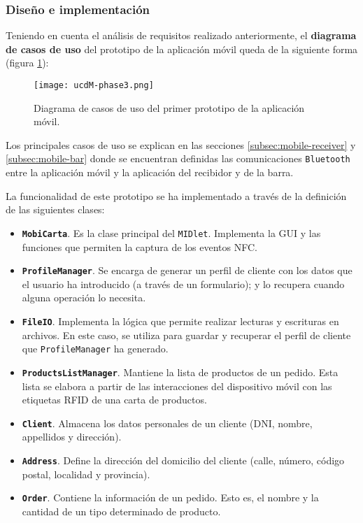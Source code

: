 \subsubsection{Diseño e implementación}
Teniendo en cuenta el análisis de requisitos realizado anteriormente, el
\textbf{diagrama de casos de uso} del prototipo de la aplicación móvil queda
de la siguiente forma (figura \ref{fig:ucdM-phase3}):

  \begin{figure}[H]
    \begin{center}
      \texttt{[image: ucdM-phase3.png]}
      \caption{Diagrama de casos de uso del primer prototipo de la aplicación
      móvil.}
      \label{fig:ucdM-phase3}
    \end{center}
  \end{figure}

Los principales casos de uso se explican en las secciones
\ref{subsec:mobile-receiver} y \ref{subsec:mobile-bar} donde se encuentran
definidas las comunicaciones \texttt{Bluetooth} entre la aplicación móvil y
la aplicación del recibidor y de la barra.

La funcionalidad de este prototipo se ha implementado a través de la
definición de las siguientes clases:
\begin{itemize}
\item \textbf{\texttt{MobiCarta}}. Es la clase principal del \texttt{MIDlet}. 
Implementa la \acs{GUI} y las funciones que permiten la captura de los eventos 
\acs{NFC}.
\item \textbf{\texttt{ProfileManager}}. Se encarga de generar un perfil de 
cliente con los datos que el usuario ha introducido (a través de un 
formulario); y lo recupera cuando alguna operación lo necesita.
\item \textbf{\texttt{FileIO}}. Implementa la lógica que permite realizar 
lecturas y escrituras en archivos. En este caso, se utiliza para guardar y 
recuperar el perfil de cliente que \texttt{ProfileManager} ha 
generado.
\item \textbf{\texttt{ProductsListManager}}. Mantiene la lista de productos
de un pedido. Esta lista se elabora a partir de las interacciones del
dispositivo móvil con las etiquetas \acs{RFID} de una carta de productos.
\item \textbf{\texttt{Client}}. Almacena los datos personales de un cliente
(DNI, nombre, appellidos y dirección).
\item \textbf{\texttt{Address}}. Define la dirección del domicilio del cliente
(calle, número, código postal, localidad y provincia).
\item \textbf{\texttt{Order}}. Contiene la información de un pedido. Esto
es, el nombre y la cantidad de un tipo determinado de producto.
\end{itemize}

